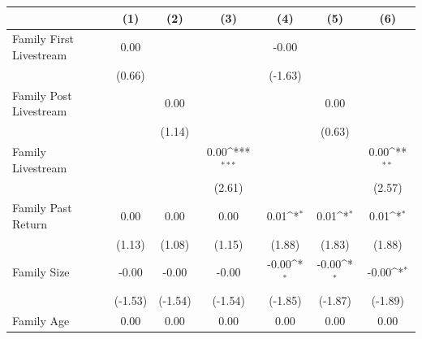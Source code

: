 {
\def\sym#1{\ifmmode^{#1}\else\(^{#1}\)\fi}
\begin{tabular}{l*{6}{c}}
\toprule
                    &\multicolumn{1}{c}{(1)}         &\multicolumn{1}{c}{(2)}         &\multicolumn{1}{c}{(3)}         &\multicolumn{1}{c}{(4)}         &\multicolumn{1}{c}{(5)}         &\multicolumn{1}{c}{(6)}         \\
\midrule
Family First Livestream&        0.00         &                     &                     &       -0.00         &                     &                     \\
                    &      (0.66)         &                     &                     &     (-1.63)         &                     &                     \\
\addlinespace
Family Post Livestream&                     &        0.00         &                     &                     &        0.00         &                     \\
                    &                     &      (1.14)         &                     &                     &      (0.63)         &                     \\
\addlinespace
Family Livestream   &                     &                     &        0.00\sym{***}&                     &                     &        0.00\sym{**} \\
                    &                     &                     &      (2.61)         &                     &                     &      (2.57)         \\
\addlinespace
Family Past Return  &        0.00         &        0.00         &        0.00         &        0.01\sym{*}  &        0.01\sym{*}  &        0.01\sym{*}  \\
                    &      (1.13)         &      (1.08)         &      (1.15)         &      (1.88)         &      (1.83)         &      (1.88)         \\
\addlinespace
Family Size         &       -0.00         &       -0.00         &       -0.00         &       -0.00\sym{*}  &       -0.00\sym{*}  &       -0.00\sym{*}  \\
                    &     (-1.53)         &     (-1.54)         &     (-1.54)         &     (-1.85)         &     (-1.87)         &     (-1.89)         \\
\addlinespace
Family Age          &        0.00         &        0.00         &        0.00         &        0.00         &        0.00         &        0.00         \\

\end{tabular}}
